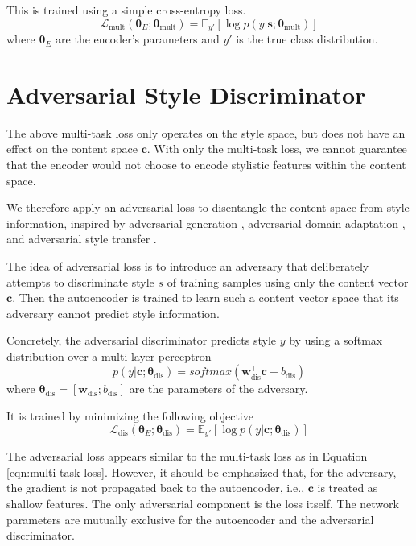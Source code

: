This is trained using a simple cross-entropy loss.
\begin{equation} \label{eqn:multi-task-loss}
	\mathcal{L}_\text{mult}(\bm\theta_{E};\bm\theta_\text{mult}) =
	\mathbb{E}_{y'} [\log p(y | \bm s; \bm\theta_\text{mult})]
\end{equation}
where $\bm\theta_E$ are the encoder's parameters and $y'$ is the true class distribution.


\section{Adversarial Style Discriminator} \label{ssec:adversarial-style-objective}

The above multi-task loss only operates on the style space, but does not have an effect on the content space $\bm c$. With only the multi-task loss, we cannot guarantee that the encoder would not choose to encode stylistic features within the content space.

We therefore apply an adversarial loss to disentangle the content space from style information, inspired by adversarial generation \citep{goodfellow2014generative}, adversarial domain adaptation \citep{liu2017adversarial}, and adversarial style transfer \citep{fu2017style}.

The idea of adversarial loss is to introduce an adversary that deliberately attempts to discriminate style $s$ of training samples using only the content vector $\bm c$. Then the autoencoder is trained to learn such a content vector space that its adversary cannot predict style information.

Concretely, the adversarial discriminator predicts style $y$ by using a softmax distribution over a multi-layer perceptron
\begin{equation}
	p(y | \bm c; \bm\theta_\text{dis}) = softmax(\bm w_\text{dis}^\top \bm c + b_\text{dis})
\end{equation}
where $\bm\theta_\text{dis}=[\bm w_\text{dis}; b_\text{dis}]$ are the parameters of the adversary.

It is trained by minimizing the following objective
\begin{equation} \label{eqn:adv-disc-loss}
	\mathcal{L}_\text{dis}(\bm\theta_{E};\bm\theta_\text{dis}) =
	\mathbb{E}_{y'} [\log p(y | \bm c; \bm\theta_\text{dis})]
\end{equation}

The adversarial loss appears similar to the multi-task loss as in Equation \ref{eqn:multi-task-loss}. However, it should be emphasized that, for the adversary, the gradient is not propagated back to the autoencoder, i.e., $\bm c$ is treated as shallow features. The only adversarial component is the loss itself. The network parameters are mutually exclusive for the autoencoder and the adversarial discriminator.

